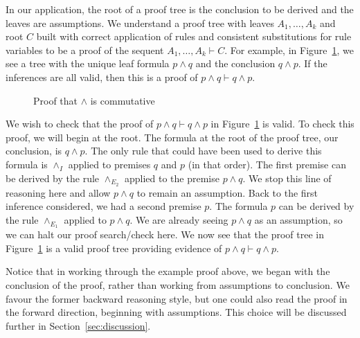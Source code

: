 \documentclass[conference]{IEEEtran}
\begin{document}
In our application, the root of a proof tree is the conclusion to be derived and the leaves are assumptions. We understand a proof tree with leaves $A_1, \dots, A_k$ and root $C$ built with correct application of rules and consistent substitutions for rule variables to be a proof of the sequent $A_1, \dots, A_k \vdash C$. For example, in Figure~\ref{fig:andcomm}, we see a tree with the unique leaf formula $p \wedge q$ and the conclusion $q \wedge p$. If the inferences are all valid, then this is a proof of $p \wedge q \vdash q \wedge p$.

\begin{figure}[h]

\begin{prooftree}


\end{prooftree}

\caption{Proof that $\wedge$ is commutative}
\label{fig:andcomm}
\end{figure}

We wish to check that the proof of $p \wedge q \vdash q \wedge p$ in Figure~\ref{fig:andcomm} is valid. To check this proof, we will begin at the root. The formula at the root of the proof tree, our conclusion, is $q \wedge p$. The only rule that could have been used to derive this formula is $\wedge_I$ applied to premises $q$ and $p$ (in that order). The first premise can be derived by the rule $\wedge_{E_2}$ applied to the premise $p \wedge q$. We stop this line of reasoning here and allow $p \wedge q$ to remain an assumption. Back to the first inference considered, we had a second premise $p$. The formula $p$ can be derived by the rule $\wedge_{E_1}$ applied to $p \wedge q$. We are already seeing $p \wedge q$ as an assumption, so we can halt our proof search/check here. We now see that the proof tree in Figure~\ref{fig:andcomm} is a valid proof tree providing evidence of $p \wedge q \vdash q \wedge p$.

Notice that in working through the example proof above, we began with the conclusion of the proof, rather than working from assumptions to conclusion. We favour the former backward reasoning style, but one could also read the proof in the forward direction, beginning with assumptions. This choice will be discussed further in Section~\ref{sec:discussion}.
\end{document}
